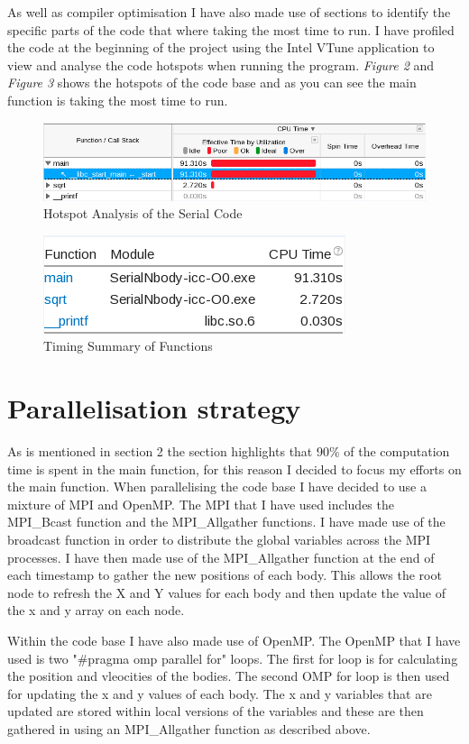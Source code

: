\documentclass[a4paper, twoside, 11pt]{article}
\begin{document}
As well as compiler optimisation I have also made use of sections to identify the specific parts of the code that where taking the most time to run. I have profiled the code at the beginning of the project using the Intel VTune application to view and analyse the code hotspots when running the program. \textit{Figure 2} and \textit{Figure 3} shows the hotspots of the code base and as you can see the main function is taking the most time to run.
\begin{figure}[H]
	\centering
	\includegraphics[scale=0.5]{images/profile1}
	\caption{Hotspot Analysis of the Serial Code}
\end{figure}
\begin{figure}[H]
\centering
\includegraphics[scale=0.5]{images/profile2}
\caption{Timing Summary of Functions}
\end{figure}
\section{Parallelisation strategy }

As is mentioned in section 2 the section highlights that 90\% of the computation time is spent in the main function, for this reason I decided to focus my efforts on the main function.
When parallelising the code base I have decided to use a mixture of MPI and OpenMP.
The MPI that I have used includes the MPI\_Bcast function and the MPI\_Allgather functions. I have made use of the broadcast function in order to distribute the global variables across the MPI processes. I have then made use of the MPI\_Allgather function at the end of each timestamp to gather the new positions of each body. This allows the root node to refresh the X and Y values for each body and then update the value of the x and y array on each node.

Within the code base I have also made use of OpenMP. The OpenMP that I have used is two "\#pragma omp parallel for" loops. The first for loop is for calculating the position and vleocities of the bodies. The second OMP for loop is then used for updating the x and y values of each body. The x and y variables that are updated are stored within local versions of the variables and these are then gathered in using an MPI\_Allgather function as described above.
\end{document}
